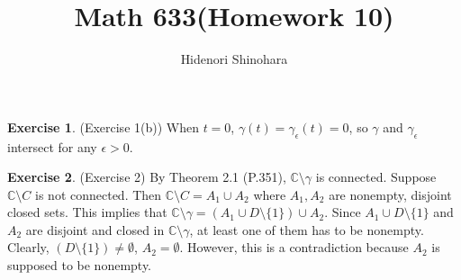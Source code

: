 \documentclass[12pt, psamsfonts]{amsart}
\theoremstyle{definition}
\newtheorem*{exer}{Exercise}
\theoremstyle{remark}
\numberwithin{equation}{section}
\begin{document}
\title{Math 633(Homework 10)}
\author{Hidenori Shinohara}
\maketitle

\begin{exer}{(Exercise 1(b))}
  When $t = 0$, $\gamma(t) = \gamma_{\epsilon}(t) = 0$, so $\gamma$ and $\gamma_{\epsilon}$ intersect for any $\epsilon > 0$.
\end{exer}

\begin{exer}{(Exercise 2)}
  By Theorem 2.1 (P.351), $\mathbb{C} \setminus \gamma$ is connected.
  Suppose $\mathbb{C} \setminus C$ is not connected.
  Then $\mathbb{C} \setminus C = A_1 \cup A_2$ where $A_1, A_2$ are nonempty, disjoint closed sets.
  This implies that $\mathbb{C} \setminus \gamma = (A_1 \cup D \setminus \{ 1 \}) \cup A_2$.
  Since $A_1 \cup D \setminus \{ 1 \}$ and $A_2$ are disjoint and closed in $\mathbb{C} \setminus \gamma$, at least one of them has to be nonempty.
  Clearly, $(D \setminus \{ 1 \}) \ne \emptyset$, $A_2 = \emptyset$.
  However, this is a contradiction because $A_2$ is supposed to be nonempty.
\end{exer}
\end{document}
